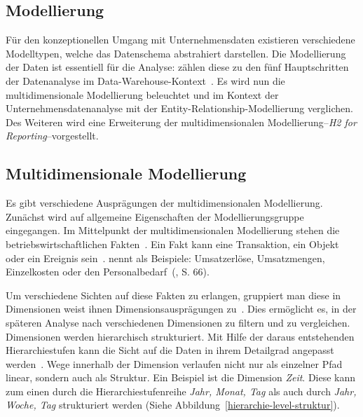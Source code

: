 \documentclass[
  language=german, %
  type=bachelor%
]{isthesis}
\begin{document}
\begin{content}
  \section{Modellierung}

  Für den konzeptionellen Umgang mit Unternehmensdaten existieren verschiedene
  Modelltypen, welche das Datenschema abstrahiert darstellen.  Die Modellierung
  der Daten ist essentiell für die Analyse:
  \textsc{\citeauthor{phipps2002automating}} zählen diese zu den fünf
  Hauptschritten der Datenanalyse im Data-Warehouse-Kontext~\cite[][S.
  1]{phipps2002automating}. Es wird nun die multidimensionale Modellierung
  beleuchtet und im Kontext der Unternehmensdatenanalyse mit der
  Entity-Relationship-Modellierung verglichen. Des Weiteren wird eine
  Erweiterung der multidimensionalen Modellierung--\textit{H2 for
  Reporting}--vorgestellt.


  \subsection{Multidimensionale
  Modellierung}\label{subsec:multidimensionale-modellierung} 

  Es gibt verschiedene Ausprägungen der multidimensionalen Modellierung.
  Zunächst wird auf allgemeine Eigenschaften der Modellierungsgruppe
  eingegangen. Im Mittelpunkt der multidimensionalen Modellierung stehen die
  betriebswirtschaftlichen Fakten~\cite[][S.  2]{phipps2002automating}. Ein
  Fakt kann eine Transaktion, ein Objekt oder ein Ereignis sein~\cite[][S.
  42]{ballard1998data}. \textsc{\citeauthor{Kemper2010}} nennt als Beispiele:
  \glqq{}Umsatzerlöse, Umsatzmengen, Einzelkosten oder den
  Personalbedarf\grqq{}~(\citeyear{Kemper2010}, S. 66). 

  Um verschiedene Sichten auf diese Fakten zu erlangen, gruppiert man diese in
  Dimensionen \bzw{} weist ihnen Dimensionsausprägungen zu~\cite[][S.
  66]{Kemper2010}. Dies ermöglicht es, in der späteren Analyse nach
  verschiedenen Dimensionen zu filtern und zu vergleichen. Dimensionen werden
  hierarchisch strukturiert. Mit Hilfe der daraus entstehenden Hierarchiestufen
  kann die Sicht auf die Daten in ihrem Detailgrad angepasst werden~\cite[][S.
  66]{Kemper2010}. Wege innerhalb der Dimension verlaufen nicht nur als
  einzelner Pfad linear, sondern auch als Struktur. Ein Beispiel ist die
  Dimension \textit{Zeit}.  Diese kann zum einen durch die
  Hierarchiestufenreihe \textit{Jahr, Monat, Tag} als auch durch \textit{Jahr,
  Woche, Tag} strukturiert werden (Siehe
  Abbildung~\ref{hierarchie-level-struktur}).


\end{content}
\end{document}
